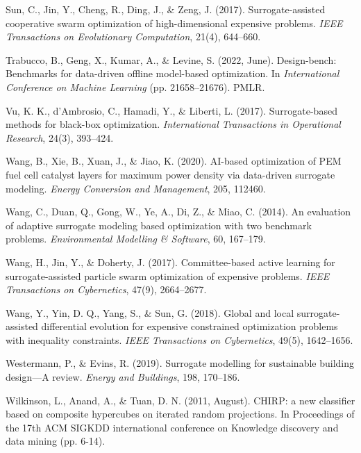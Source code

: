 \documentclass[sigconf,nonacm]{acmart}
\begin{document}
\begin{enumerate}[label={[\arabic*]}]
\item Sun, C., Jin, Y., Cheng, R., Ding, J., \& Zeng, J. (2017). Surrogate-assisted cooperative swarm optimization of high-dimensional expensive problems. \textit{IEEE Transactions on Evolutionary Computation}, 21(4), 644--660.

\item Trabucco, B., Geng, X., Kumar, A., \& Levine, S. (2022, June). Design-bench: Benchmarks for data-driven offline model-based optimization. In \textit{International Conference on Machine Learning} (pp. 21658--21676). PMLR.

\item Vu, K. K., d'Ambrosio, C., Hamadi, Y., \& Liberti, L. (2017). Surrogate-based methods for black-box optimization. \textit{International Transactions in Operational Research}, 24(3), 393--424.

\item Wang, B., Xie, B., Xuan, J., \& Jiao, K. (2020). AI-based optimization of PEM fuel cell catalyst layers for maximum power density via data-driven surrogate modeling. \textit{Energy Conversion and Management}, 205, 112460.

\item Wang, C., Duan, Q., Gong, W., Ye, A., Di, Z., \& Miao, C. (2014). An evaluation of adaptive surrogate modeling based optimization with two benchmark problems. \textit{Environmental Modelling \& Software}, 60, 167--179.

\item Wang, H., Jin, Y., \& Doherty, J. (2017). Committee-based active learning for surrogate-assisted particle swarm optimization of expensive problems. \textit{IEEE Transactions on Cybernetics}, 47(9), 2664--2677.

\item Wang, Y., Yin, D. Q., Yang, S., \& Sun, G. (2018). Global and local surrogate-assisted differential evolution for expensive constrained optimization problems with inequality constraints. \textit{IEEE Transactions on Cybernetics}, 49(5), 1642--1656.

\item Westermann, P., \& Evins, R. (2019). Surrogate modelling for sustainable building design—A review. \textit{Energy and Buildings}, 198, 170--186.

\item Wilkinson, L., Anand, A., \& Tuan, D. N. (2011, August). CHIRP: a new classifier based on composite hypercubes on iterated random projections. In Proceedings of the 17th ACM SIGKDD international conference on Knowledge discovery and data mining (pp. 6-14).


\end{enumerate}
\end{document}
